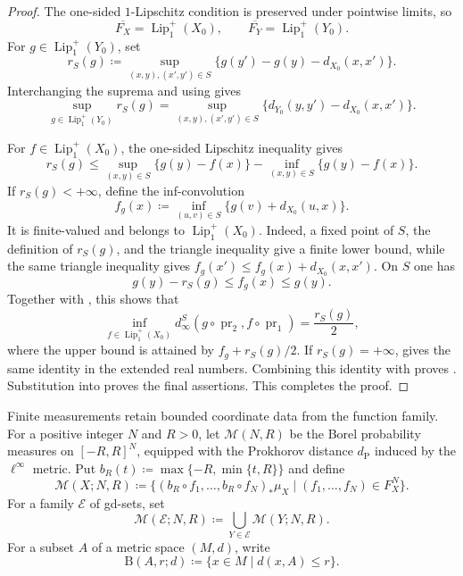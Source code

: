 \documentclass{amsart}
\theoremstyle{plain}
\theoremstyle{definition}
\theoremstyle{remark}
\newcommand{\M}{\mathcal{M}}
\newcommand{\lipplus}{\operatorname{Lip}^{+}_{1}}
\DeclareMathOperator{\pr}{pr}
\newcommand{\dpr}{d_{\operatorname{P}}}
\newcommand{\dinf}[1]{d^{#1}_{\infty}}
\begin{document}
\begin{proof}
The one-sided $1$-Lipschitz condition is preserved under pointwise limits,
so
\[ \overline{F_X}=\lipplus(X_0),\qquad \overline{F_Y}=\lipplus(Y_0). \]
For $g\in\lipplus(Y_0)$, set
\[ r_S(g)\coloneqq \sup_{(x,y),(x',y')\in S} \{g(y')-g(y)-d_{X_0}(x,x')\}. \]
Interchanging the suprema and using  gives
\begin{equation}
\label{eq:directed-distortion-first-identity}
\sup_{g\in\lipplus(Y_0)}r_S(g)
=\sup_{(x,y),(x',y')\in S}
\{d_{Y_0}(y,y')-d_{X_0}(x,x')\}.
\end{equation}

For $f\in\lipplus(X_0)$, the one-sided Lipschitz inequality gives
\begin{equation}
\label{eq:directed-distortion-oscillation}
r_S(g)\leq
\sup_{(x,y)\in S}\{g(y)-f(x)\}
-\inf_{(x,y)\in S}\{g(y)-f(x)\}.
\end{equation}
If $r_S(g)<+\infty$, define the inf-convolution
\[
f_g(x)\coloneqq\inf_{(u,v)\in S}\{g(v)+d_{X_0}(u,x)\}.
\]
It is finite-valued and belongs to $\lipplus(X_0)$.  Indeed, a fixed point
of $S$, the definition of $r_S(g)$, and the triangle inequality give a
finite lower bound, while the same triangle inequality gives
$f_g(x')\leq f_g(x)+d_{X_0}(x,x')$.  On $S$ one has
\[
g(y)-r_S(g)\leq f_g(x)\leq g(y).
\]
Together with , this shows that
\[ \inf_{f\in\lipplus(X_0)}\dinf{S}(g\circ\pr_2,f\circ\pr_1) =\frac{r_S(g)}2, \]
where the upper bound is attained by $f_g+r_S(g)/2$.  If
$r_S(g)=+\infty$,  gives the same
identity in the extended real numbers.  Combining this identity with
proves .  Substitution into
 proves the final assertions.  This
completes the proof.
\end{proof}

Finite measurements retain bounded coordinate data from the function family.
For a positive integer $N$ and $R>0$, let $\M(N,R)$ be the Borel probability
measures on $[-R,R]^N$, equipped with the Prokhorov distance $\dpr$ induced by
the $\ell^\infty$ metric.  Put
$b_R(t)\coloneqq\max\{-R,\min\{t,R\}\}$ and define
\begin{equation}
\label{eq:ordered-measurement}
\M(X;N,R)\coloneqq
\{(b_R\circ f_1,\ldots,b_R\circ f_N)_*\mu_X\mid
(f_1,\ldots,f_N)\in F_X^N\}.
\end{equation}
For a family $\mathcal E$ of gd-sets, set
\[
\M(\mathcal E;N,R)\coloneqq\bigcup_{Y\in\mathcal E}\M(Y;N,R).
\]
For a subset $A$ of a metric space $(M,d)$, write
\[
\mathrm B(A,r;d)\coloneqq\{x\in M\mid d(x,A)\leq r\}.
\]
\end{document}
